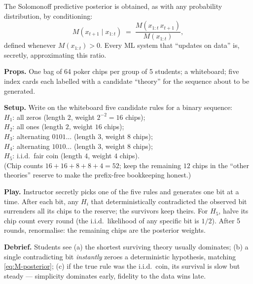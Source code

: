 \noindent The Solomonoff predictive posterior is obtained, as with any
probability distribution, by conditioning:
\begin{equation}
  M(x_{t+1} \mid x_{1:t}) \;=\; \frac{M(x_{1:t}\,x_{t+1})}{M(x_{1:t})},
  \label{eq:M-posterior}
\end{equation}
defined whenever $M(x_{1:t}) > 0$.  Every ML system that ``updates on
data'' is, secretly, approximating this ratio.

\begin{activity}
\label{act:prediction-market}
\textbf{Props.}  One bag of 64 poker chips per group of 5 students; a
whiteboard; five index cards each labelled with a candidate
``theory'' for the sequence about to be generated.

\textbf{Setup.}  Write on the whiteboard five candidate rules for a
binary sequence: \\
$H_1$: all zeros (length $2$, weight $2^{-2}=16$ chips); \\
$H_2$: all ones (length $2$, weight $16$ chips); \\
$H_3$: alternating $0101\ldots$ (length $3$, weight $8$ chips); \\
$H_4$: alternating $1010\ldots$ (length $3$, weight $8$ chips); \\
$H_5$: i.i.d.\ fair coin (length $4$, weight $4$ chips). \\
(Chip counts $16+16+8+8+4=52$; keep the remaining $12$ chips in the
``other theories'' reserve to make the prefix-free bookkeeping
honest.)

\textbf{Play.}  Instructor secretly picks one of the five rules and
generates one bit at a time.  After each bit, any $H_i$ that
deterministically contradicted the observed bit surrenders all its
chips to the reserve; the survivors keep theirs.  For $H_5$, halve
its chip count every round (the i.i.d.\ likelihood of any specific
bit is $1/2$).  After 5 rounds, renormalise: the remaining chips are
the posterior weights.

\textbf{Debrief.}  Students see (a) the shortest surviving theory
usually dominates; (b) a single contradicting bit \emph{instantly}
zeroes a deterministic hypothesis, matching
\eqref{eq:M-posterior}; (c) if the true rule was the i.i.d.\ coin,
its survival is slow but steady --- simplicity dominates early,
fidelity to the data wins late.
\end{activity}

